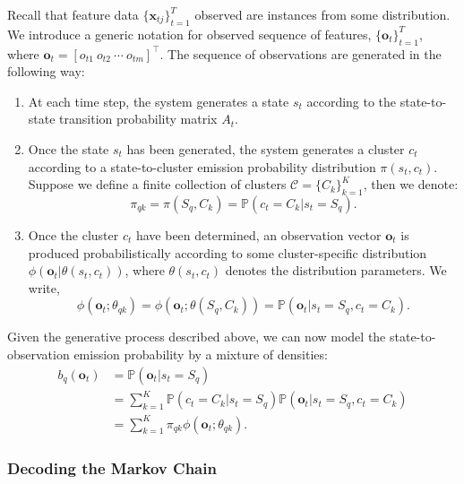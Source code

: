 Recall that feature data $\{ \mathbf{x}_{tj} \}_{t=1}^{T}$ observed are instances from some distribution. We introduce a generic notation for observed sequence of features, $\{ \mathbf{o}_{t} \}_{t=1}^{T}$, where $\mathbf{o}_t = [o_{t1} ~o_{t2} ~\cdots ~o_{tm}]^\top$. The sequence of observations are generated in the following way:
\begin{enumerate}
\item At each time step, the system generates a state $s_t$ according to the state-to-state transition probability matrix $A_t$.
\item Once the state $s_t$ has been generated, the system generates a cluster $c_t$ according to a state-to-cluster emission probability distribution $\pi(s_t,c_t)$. Suppose we define a finite collection of clusters $\mathcal{C} = \{ C_k \}_{k=1}^K$, then we denote:
\begin{equation}
\pi_{qk} = \pi(S_q, C_k) = \mathbb{P} \left( c_t = C_k | s_t = S_q \right).
\end{equation}
\item Once the cluster $c_t$ have been determined, an observation vector $\mathbf{o}_t$ is produced probabilistically according to some cluster-specific distribution $\phi(\mathbf{o}_t | \theta (s_t, c_t))$, where $\theta (s_t, c_t)$ denotes the distribution parameters. We write,
\begin{equation}
\phi(\mathbf{o}_t ; \theta_{qk}) =  \phi(\mathbf{o}_t ; \theta (S_q, C_k)) = \mathbb{P} \left( \mathbf{o}_t | s_t = S_q, c_t = C_k \right).
\end{equation}
\end{enumerate}
Given the generative process described above, we can now model the state-to-observation emission probability by a mixture of densities:
\begin{subequations}
\begin{align}
b_q (\mathbf{o}_t) & = \mathbb{P} \left( \mathbf{o}_t | s_t = S_q \right) \\
 & = \sum_{k=1}^K  \mathbb{P} \left( c_t = C_k | s_t = S_q \right) \mathbb{P} \left( \mathbf{o}_t | s_t = S_q, c_t = C_k \right) \\
 & = \sum_{k=1}^K \pi_{qk} \phi(\mathbf{o}_t ; \theta_{qk}).
\end{align}
\label{eq:emission}
\end{subequations}

\subsubsection{Decoding the Markov Chain}

